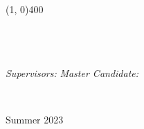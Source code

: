 \begin{titlepage}
	\scshape{\huge{{\thesisUniversity}}} \\
	\line(1, 0){400} \\[2mm]


	\textsf{\thesisUniversityDepartment} \\
	\textsf{\thesisUniversityGroup} \\

	\vfill
	{\LARGE \color{ctcolortitle}\textbf{\thesisTitle} \\[10mm]}


	\begin{center}

	\vfill
	\begin{normalsize}
	\begin{flushleft}	  
	  \textit{Supervisors:} \hfill \textit{Master Candidate:}\\
		\vspace{1pt}

		\thesisFirstSupervisor \hfill {\Large \thesisName} \\
		\thesisSecondSupervisor

		\vspace{30pt}
		\centering
		Summer 2023

	\end{flushleft}
	\end{normalsize}
	
	\end{center}
	\vspace*{\fill}
	\singlespacing
	\cleardoublepage


	\vfill
\end{titlepage}


